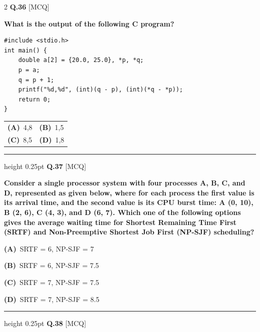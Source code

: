 \documentclass[a4paper,10pt,twoside]{article}
\begin{document}
\begin{multicols}{2}
\noindent\textbf{Q.36} \hfill {\footnotesize\textsf{[MCQ]}}
\par\vspace{2pt}
{\bfseries What is the output of the following C program?
\begin{verbatim}
#include <stdio.h>
int main() {
    double a[2] = {20.0, 25.0}, *p, *q;
    p = a;
    q = p + 1;
    printf("%d,%d", (int)(q - p), (int)(*q - *p));
    return 0;
}
\end{verbatim} \par}
\par\vspace{2pt}\noindent
\begin{tabular*}{\columnwidth}{@{\extracolsep{\fill}}p{}p{}@{}}
\textbf{(A)}~4,8 & \textbf{(B)}~1,5 \\
\addlinespace[2pt]
\textbf{(C)}~8,5 & \textbf{(D)}~1,8
\end{tabular*}
\par\vspace{6pt}\hrule height 0.25pt\vspace{6pt}
\noindent\textbf{Q.37} \hfill {\footnotesize\textsf{[MCQ]}}
\par\vspace{2pt}
{\bfseries Consider a single processor system with four processes A, B, C, and D, represented as given below, where for each process the first value is its arrival time, and the second value is its CPU burst time:
A (0, 10), B (2, 6), C (4, 3), and D (6, 7).
Which one of the following options gives the average waiting time for Shortest Remaining Time First (SRTF) and Non-Preemptive Shortest Job First (NP-SJF) scheduling? \par}
\par\vspace{2pt}\noindent
\textbf{(A)}~SRTF = 6, NP-SJF = 7\par\vspace{2pt}\noindent
\textbf{(B)}~SRTF = 6, NP-SJF = 7.5\par\vspace{2pt}\noindent
\textbf{(C)}~SRTF = 7, NP-SJF = 7.5\par\vspace{2pt}\noindent
\textbf{(D)}~SRTF = 7, NP-SJF = 8.5
\par\vspace{6pt}\hrule height 0.25pt\vspace{6pt}
\noindent\textbf{Q.38} \hfill {\footnotesize\textsf{[MCQ]}}
\par\vspace{2pt}

\end{multicols}
\end{document}
